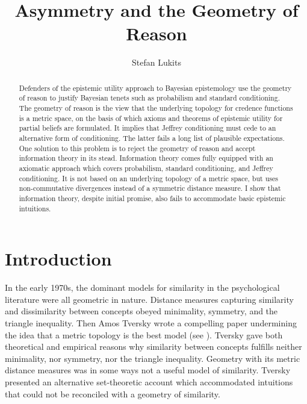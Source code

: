 \documentclass[11pt]{article}
\begin{document}
\setpagewiselinenumbers
\modulolinenumbers[5]
\linenumbers


\title{Asymmetry and the Geometry of Reason}
\author{Stefan Lukits}
\date{}
\maketitle

\begin{abstract}
  {\noindent}Defenders of the epistemic utility approach to Bayesian
  epistemology use the geometry of reason to justify Bayesian tenets
  such as probabilism and standard conditioning. The geometry of
  reason is the view that the underlying topology for credence
  functions is a metric space, on the basis of which axioms and
  theorems of epistemic utility for partial beliefs are formulated. It
  implies that Jeffrey conditioning must cede to an alternative form
  of conditioning. The latter fails a long list of plausible
  expectations. One solution to this problem is to reject the geometry
  of reason and accept information theory in its stead. Information
  theory comes fully equipped with an axiomatic approach which covers
  probabilism, standard conditioning, and Jeffrey conditioning. It is
  not based on an underlying topology of a metric space, but uses
  non-commutative divergences instead of a symmetric distance measure.
  I show that information theory, despite initial promise, also fails
  to accommodate basic epistemic intuitions.
\end{abstract}

\section{Introduction}
\label{intr}

In the early 1970s, the dominant models for similarity in the
psychological literature were all geometric in nature. Distance
measures capturing similarity and dissimilarity between concepts
obeyed minimality, symmetry, and the triangle inequality. Then Amos
Tversky wrote a compelling paper undermining the idea that a metric
topology is the best model (see ). Tversky gave
both theoretical and empirical reasons why similarity between concepts
fulfills neither minimality, nor symmetry, nor the triangle inequality.
Geometry with its metric distance measures was in some ways not a
useful model of similarity. Tversky presented an alternative
set-theoretic account which accommodated intuitions that could not be
reconciled with a geometry of similarity.
\end{document}
